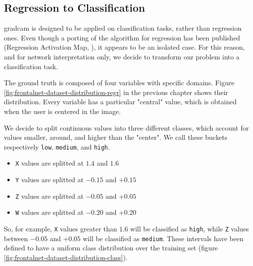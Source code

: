 \subsection{Regression to Classification}
\label{subsec:gradcam-regrtoclass}

\gls{gradcam} is designed to be applied on classification tasks, rather than regression ones. Even though a porting of the algorithm for regression has been published (Regression Activation Map, \cite{wang2019diabetic}), it appears to be an isolated case. For this reason, and for network interpretation only, we decide to transform our problem into a classification task.

The ground truth is composed of four variables with specific domains. Figure \ref{fig:frontalnet-dataset-distribution-regr} in the previous chapter shows their distribution. Every variable has a particular "central" value, which is obtained when the user is centered in the image. 

We decide to split continuous values into three different classes, which account for values smaller, around, and higher than the "center". We call these buckets respectively \texttt{low}, \texttt{medium}, and \texttt{high}.

\begin{itemize}
	\item \texttt{X} values are splitted at $1.4$ and $1.6$
	\item \texttt{Y} values are splitted at $-0.15$ and $+0.15$
	\item \texttt{Z} values are splitted at $-0.05$ and $+0.05$
	\item \texttt{W} values are splitted at $-0.20$ and $+0.20$
\end{itemize}

So, for example, \texttt{X} values greater than $1.6$ will be classified as \texttt{high}, while \texttt{Z} values between $-0.05$ and $+0.05$ will be classified as \texttt{medium}. These intervals have been defined to have a uniform class distribution over the training set (figure \ref{fig:frontalnet-dataset-distribution-class}).

